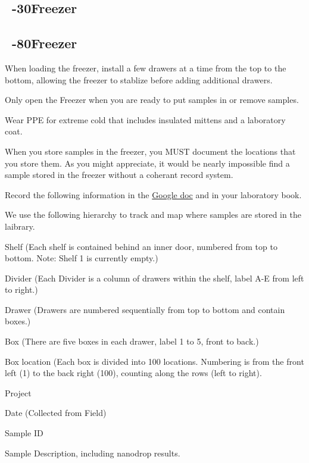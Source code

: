 \documentclass[12pt]{../SOP3_alpha}
\begin{document}
\NP 

\subsection{~-30\degree Freezer}

\NP 

\subsection{~-80\degree Freezer}

\NP When loading the freezer, install a few drawers at a time from the top to the bottom, allowing the freezer to stablize before adding additional drawers.

\NP Only open the Freezer when you are ready to put samples in or remove samples. 

\NP Wear PPE for extreme cold that includes insulated mittens and a laboratory coat.

\NP When you store samples in the freezer, you MUST document the locations that you store them. As you might appreciate, it would be nearly impossible find a sample stored in the freezer without a coherant record system.

\NP Record the following information in the \href{https://docs.google.com/spreadsheets/d/1ohQFRFMBHCu2Wm8H58UH67SJ_uvwSsbRFGZVjZr9Bjc/edit?usp=sharing}{Google doc} and in your laboratory book.

We use the following hierarchy to track and map where samples are stored in the laibrary. 
\begin{itemize*}
  \item Shelf (Each shelf is contained behind an inner door, numbered from top to bottom. Note: Shelf 1 is currently empty.)
  \item Divider (Each Divider is a column of drawers within the shelf, label A-E from left to right.)
  \item Drawer (Drawers are numbered sequentially from top to bottom and contain boxes.)
  \item Box (There are five boxes in each drawer, label 1 to 5, front to back.)
  \item Box location (Each box is divided into 100 locations. Numbering is from the front left (1) to the back right (100), counting along the rows (left to right).
  \item Project
  \item Date (Collected from Field)
  \item Sample ID
  \item Sample Description, including nanodrop results.
\end{itemize*}
\end{document}
